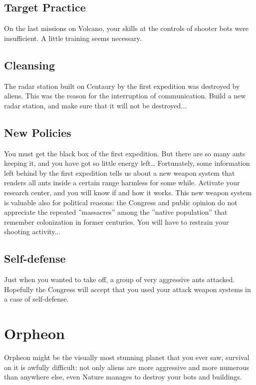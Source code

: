 \subsection{Target Practice}

On the last missions on Volcano, your skills at the controls of shooter bots were insufficient. A little training seems necessary.


\subsection{Cleansing}

The radar station built on Centaury by the first expedition was destroyed by aliens. This was the reason for the interruption of communication. Build a new radar station, and make sure that it will not be destroyed...


\subsection{New Policies}

You must get the black box of the first expedition. But there are so many ants keeping it, and you have got so little energy left… Fortunately, some information left behind by the first expedition tells us about a new weapon system that renders all ants inside a certain range harmless for some while. Activate your research center, and you will know if and how it works. This new weapon system is valuable also for political reasons: the Congress and public opinion do not appreciate the repeated ''massacres'' among the ''native population'' that remember colonization in former centuries. You will have to restrain your shooting activity...


\subsection{Self-defense}

Just when you wanted to take off, a group of very aggressive ants attacked. Hopefully the Congress will accept that you used your attack weapon systems in a case of self-defense.


\section{Orpheon}

Orpheon might be the visually most stunning planet that you ever saw, survival on it is awfully difficult: not only aliens are more aggressive and more numerous than anywhere else, even Nature manages to destroy your bots and buildings.


